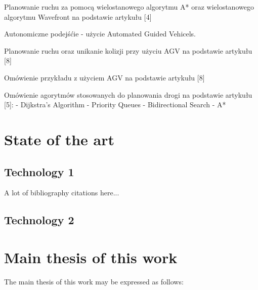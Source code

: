Planowanie ruchu za pomocą wielostanowego algorytmu A* oraz wielostanowego algorytmu Wavefront na podstawie artykułu [4]

Autonomiczne podejśćie - użycie Automated Guided Vehicels.

Planowanie ruchu oraz unikanie kolizji przy użyciu AGV na podstawie artykułu [8]

Omówienie przykładu z użyciem AGV na podstawie artykułu [8]

Omówienie agorytmów stosowanych do planowania drogi na podstawie artykułu [5]:
- Dijkstra's Algorithm
- Priority Queues
- Bidirectional Search
- A*

\section{State of the art}

\subsection{Technology 1}

A lot of bibliography citations here...

\bt

\subsection{Technology 2}

\bt

\section{Main thesis of this work}

The main thesis of this work may be expressed as follows:

\medskip

\textit{
	\bt
}

